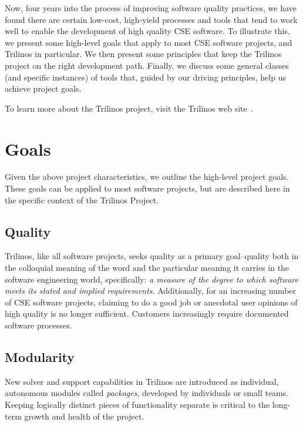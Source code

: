 \documentclass[times,10pt,twocolumn]{article}
\begin{document}
Now, four years into the process of improving software quality
practices, we have found there are certain low-cost, high-yield
processes and tools that tend to work well to enable the development
of high quality CSE software.  To illustrate this, we present some
high-level goals that apply to most CSE software projects, and
Trilinos in particular.  We then present some principles that keep
the Trilinos project on the right development path.  Finally, we
discuss some general classes (and specific instances) of tools that,
guided by our driving principles, help us achieve project goals.

To learn more about the Trilinos project, visit the Trilinos web
site~\cite{Trilinos-home-page}.


\section{Goals}
\label{Section:Goals}

Given the above project characteristics, we outline the high-level
project goals. These goals can be applied to most software projects,
but are described here in the specific context of the Trilinos
Project.

\subsection{Quality}
Trilinos, like all software projects, seeks quality as a primary
goal--quality both in the colloquial meaning of the word and the
particular meaning it carries in the software engineering world,
specifically:  \emph{a measure of the degree to which software meets
its stated and implied requirements}.  Additionally, for an
increasing number of CSE software projects, claiming to do a good
job or anecdotal user opinions of high quality is no longer
sufficient. Customers increasingly require documented software
processes.

\subsection{Modularity}
New solver and support capabilities in Trilinos are introduced as
individual, autonomous modules called \emph{packages}, developed by
individuals or small teams. Keeping logically distinct pieces of
functionality separate is critical to the long-term growth and
health of the project.
\end{document}

